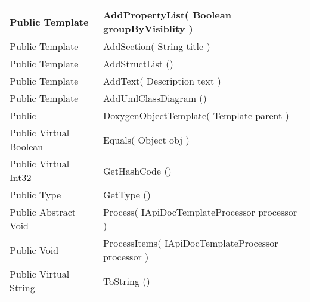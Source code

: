 \documentclass[11pt, oneside, a4paper]{book}
\begin{document}
\begin{center}
\begin{tabular}{| p{3cm} | p{12cm} | }
 Public  Template &  AddPropertyList(\hypertarget{SoftwareEngineeringTools.{}Documentation.{}DoxygenObjectTemplate.{}AddPropertyList\_Boolean}{} Boolean  groupByVisiblity  )\\
\hline
 Public  Template &  AddSection(\hypertarget{SoftwareEngineeringTools.{}Documentation.{}DoxygenObjectTemplate.{}AddSection\_String}{} String  title  )\\
\hline
 Public  Template &  AddStructList ()\hypertarget{SoftwareEngineeringTools.{}Documentation.{}DoxygenObjectTemplate.{}AddStructList}{}\\
\hline
 Public  Template &  AddText(\hypertarget{SoftwareEngineeringTools.{}Documentation.{}DoxygenObjectTemplate.{}AddText\_Description}{} Description  text  )\\
\hline
 Public  Template &  AddUmlClassDiagram ()\hypertarget{SoftwareEngineeringTools.{}Documentation.{}DoxygenObjectTemplate.{}AddUmlClassDiagram}{}\\
\hline
 Public  &  DoxygenObjectTemplate(\hypertarget{SoftwareEngineeringTools.{}Documentation.{}DoxygenObjectTemplate.{}DoxygenObjectTemplate\_Template}{} Template  parent  )\\
\hline
 Public  Virtual  Boolean &  Equals(\hypertarget{SoftwareEngineeringTools.{}Documentation.{}DoxygenObjectTemplate.{}Equals\_Object}{} Object  obj  )\\
\hline
 Public  Virtual  Int32 &  GetHashCode ()\hypertarget{SoftwareEngineeringTools.{}Documentation.{}DoxygenObjectTemplate.{}GetHashCode}{}\\
\hline
 Public  Type &  GetType ()\hypertarget{SoftwareEngineeringTools.{}Documentation.{}DoxygenObjectTemplate.{}GetType}{}\\
\hline
 Public  Abstract  Void &  Process(\hypertarget{SoftwareEngineeringTools.{}Documentation.{}DoxygenObjectTemplate.{}Process\_IApiDocTemplateProcessor}{} IApiDocTemplateProcessor  processor  )\\
\hline
 Public  Void &  ProcessItems(\hypertarget{SoftwareEngineeringTools.{}Documentation.{}DoxygenObjectTemplate.{}ProcessItems\_IApiDocTemplateProcessor}{} IApiDocTemplateProcessor  processor  )\\
\hline
 Public  Virtual  String &  ToString ()\hypertarget{SoftwareEngineeringTools.{}Documentation.{}DoxygenObjectTemplate.{}ToString}{}\\
\hline
\end{tabular}
\end{center}
 
\end{document}
